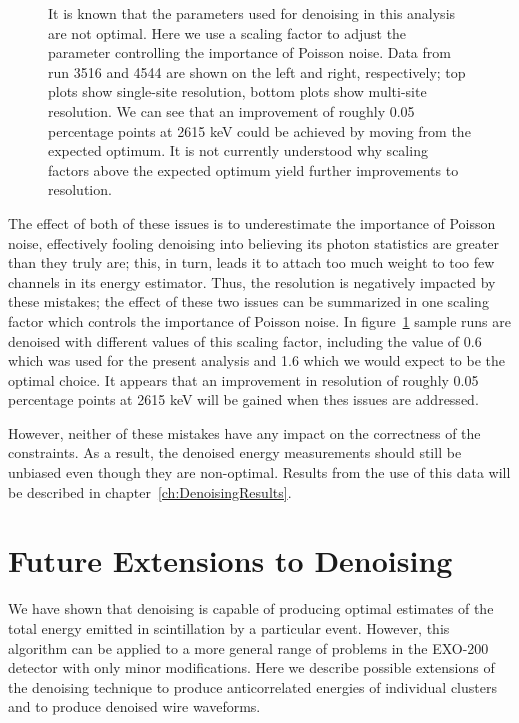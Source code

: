 \begin{figure}
\begin{quote}
\caption{It is known that the parameters used for denoising in this analysis are not optimal.  Here we use a scaling factor to adjust the parameter controlling the importance of Poisson noise.  Data from run 3516 and 4544 are shown on the left and right, respectively; top plots show single-site resolution, bottom plots show multi-site resolution.  We can see that an improvement of roughly 0.05 percentage points at 2615 keV could be achieved by moving from the expected optimum.  It is not currently understood why scaling factors above the expected optimum yield further improvements to resolution.}
\label{fig:Denoising_ResVsAPDGain_ScalingFactor}
\end{quote}
\end{figure}
\renewcommand{\baselinestretch}{2}
\small\normalsize

The effect of both of these issues is to underestimate the importance of Poisson noise, effectively fooling denoising into believing its photon statistics are greater than they truly are; this, in turn, leads it to attach too much weight to too few channels in its energy estimator.  Thus, the resolution is negatively impacted by these mistakes; the effect of these two issues can be summarized in one scaling factor which controls the importance of Poisson noise.  In figure~\ref{fig:Denoising_ResVsAPDGain_ScalingFactor} sample runs are denoised with different values of this scaling factor, including the value of 0.6 which was used for the present analysis and 1.6 which we would expect to be the optimal choice.  It appears that an improvement in resolution of roughly 0.05 percentage points at 2615 keV will be gained when thes issues are addressed.

However, neither of these mistakes have any impact on the correctness of the constraints.  As a result, the denoised energy measurements should still be unbiased even though they are non-optimal.  Results from the use of this data will be described in chapter~\ref{ch:DenoisingResults}.

\section{Future Extensions to Denoising}\label{sec:FutureDenoisingExtensions}

We have shown that denoising is capable of producing optimal estimates of the total energy emitted in scintillation by a particular event.  However, this algorithm can be applied to a more general range of problems in the EXO-200 detector with only minor modifications.  Here we describe possible extensions of the denoising technique to produce anticorrelated energies of individual clusters and to produce denoised wire waveforms.

